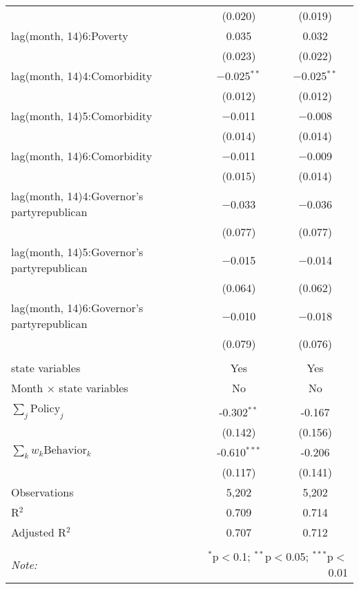 \begin{tabular}{@{\extracolsep{1pt}}lcc}
  & (0.020) & (0.019) \\ 
  lag(month, 14)6:Poverty & 0.035 & 0.032 \\ 
  & (0.023) & (0.022) \\ 
  lag(month, 14)4:Comorbidity & $-$0.025$^{**}$ & $-$0.025$^{**}$ \\ 
  & (0.012) & (0.012) \\ 
  lag(month, 14)5:Comorbidity & $-$0.011 & $-$0.008 \\ 
  & (0.014) & (0.014) \\ 
  lag(month, 14)6:Comorbidity & $-$0.011 & $-$0.009 \\ 
  & (0.015) & (0.014) \\ 
  lag(month, 14)4:Governor's partyrepublican & $-$0.033 & $-$0.036 \\ 
  & (0.077) & (0.077) \\ 
  lag(month, 14)5:Governor's partyrepublican & $-$0.015 & $-$0.014 \\ 
  & (0.064) & (0.062) \\ 
  lag(month, 14)6:Governor's partyrepublican & $-$0.010 & $-$0.018 \\ 
  & (0.079) & (0.076) \\ 
 \hline \\[-1.8ex] 
state variables & Yes & Yes \\ 
Month $\times$ state variables & No & No \\ 
\hline \\[-1.8ex] 
$\sum_j \mathrm{Policy}_j$ & -0.302$^{**}$ & -0.167 \\ 
 & (0.142) & (0.156) \\ 
$\sum_k w_k \mathrm{Behavior}_k$ & -0.610$^{***}$ & -0.206 \\ 
 & (0.117) & (0.141) \\ 
Observations & 5,202 & 5,202 \\ 
R$^{2}$ & 0.709 & 0.714 \\ 
Adjusted R$^{2}$ & 0.707 & 0.712 \\ 
\hline 
\hline \\[-1.8ex] 
\textit{Note:}  & \multicolumn{2}{r}{$^{*}$p$<$0.1; $^{**}$p$<$0.05; $^{***}$p$<$0.01} \\ 
\end{tabular} 